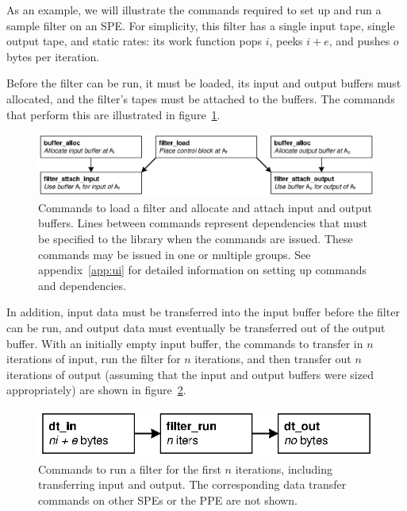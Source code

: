 As an example, we will illustrate the commands required to set up and run a sample filter on an SPE. For simplicity, this filter has a single input tape, single output tape, and static rates: its work function pops $i$, peeks $i+e$, and pushes $o$ bytes per iteration.

Before the filter can be run, it must be loaded, its input and output buffers must allocated, and the filter's tapes must be attached to the buffers. The commands that perform this are illustrated in figure~\ref{fig:lib:init}.

\begin{figure}[!htb]
\begin{center}
\includegraphics{figs/init}
\end{center}
\caption[Commands to set up a filter.]{Commands to load a filter and allocate and attach input and output buffers. Lines between commands represent dependencies that must be specified to the library when the commands are issued. These commands may be issued in one or multiple groups. See appendix~\ref{app:ui} for detailed information on setting up commands and dependencies.}
\label{fig:lib:init}
\end{figure}

In addition, input data must be transferred into the input buffer before the filter can be run, and output data must eventually be transferred out of the output buffer. With an initially empty input buffer, the commands to transfer in $n$ iterations of input, run the filter for $n$ iterations, and then transfer out $n$ iterations of output (assuming that the input and output buffers were sized appropriately) are shown in figure~\ref{fig:lib:run}.

\begin{figure}[!htb]
\begin{center}
\includegraphics{figs/run}
\end{center}
\caption[Commands to run a filter.]{Commands to run a filter for the first $n$ iterations, including transferring input and output. The corresponding data transfer commands on other SPEs or the PPE are not shown.}
\label{fig:lib:run}
\end{figure}

